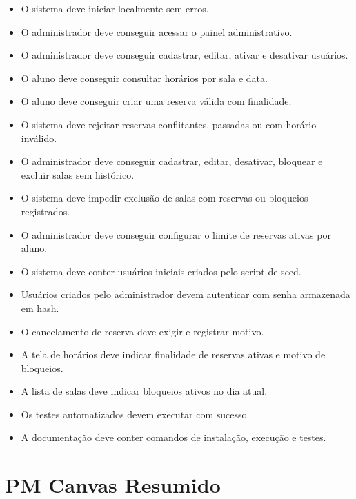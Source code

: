 \documentclass[12pt,a4paper]{article}
\begin{document}
\begin{itemize}
    \item O sistema deve iniciar localmente sem erros.
    \item O administrador deve conseguir acessar o painel administrativo.
    \item O administrador deve conseguir cadastrar, editar, ativar e desativar usuários.
    \item O aluno deve conseguir consultar horários por sala e data.
    \item O aluno deve conseguir criar uma reserva válida com finalidade.
    \item O sistema deve rejeitar reservas conflitantes, passadas ou com horário inválido.
    \item O administrador deve conseguir cadastrar, editar, desativar, bloquear e excluir salas sem histórico.
    \item O sistema deve impedir exclusão de salas com reservas ou bloqueios registrados.
    \item O administrador deve conseguir configurar o limite de reservas ativas por aluno.
    \item O sistema deve conter usuários iniciais criados pelo script de seed.
    \item Usuários criados pelo administrador devem autenticar com senha armazenada em hash.
    \item O cancelamento de reserva deve exigir e registrar motivo.
    \item A tela de horários deve indicar finalidade de reservas ativas e motivo de bloqueios.
    \item A lista de salas deve indicar bloqueios ativos no dia atual.
    \item Os testes automatizados devem executar com sucesso.
    \item A documentação deve conter comandos de instalação, execução e testes.
\end{itemize}

\section{PM Canvas Resumido}
\end{document}
